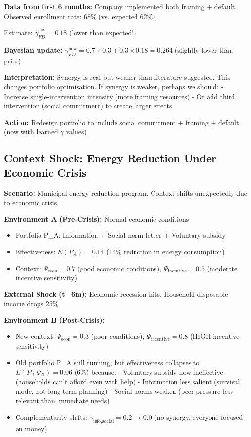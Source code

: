 \textbf{Data from first 6 months:} Company implemented both framing + default. Observed enrollment rate: 68\% (vs. expected 62\%).

Estimate: $\hat{\gamma}_{FD}^{\text{obs}} = 0.18$ (lower than expected!)

\textbf{Bayesian update:} $\gamma_{FD}^{\text{new}} = 0.7 \times 0.3 + 0.3 \times 0.18 = 0.264$ (slightly lower than prior)

\textbf{Interpretation:} Synergy is real but weaker than literature suggested. This changes portfolio optimization. If synergy is weaker, perhaps we should:
- Increase single-intervention intensity (more framing resources)
- Or add third intervention (social commitment) to create larger effects

\textbf{Action:} Redesign portfolio to include social commitment + framing + default (now with learned $\gamma$ values)

\subsection{Context Shock: Energy Reduction Under Economic Crisis}

\textbf{Scenario:} Municipal energy reduction program. Context shifts unexpectedly due to economic crisis.

\textbf{Environment A (Pre-Crisis):} Normal economic conditions
\begin{itemize}[nosep]
\item Portfolio P_A: Information + Social norm letter + Voluntary subsidy
\item Effectiveness: $E(P_A) = 0.14$ (14\% reduction in energy consumption)
\item Context: $\Psi_{\text{econ}} = 0.7$ (good economic conditions), $\Psi_{\text{incentive}} = 0.5$ (moderate incentive sensitivity)
\end{itemize}

\textbf{External Shock (t=6m):} Economic recession hits. Household disposable income drops 25\%.

\textbf{Environment B (Post-Crisis):}
\begin{itemize}[nosep]
\item New context: $\Psi_{\text{econ}} = 0.3$ (poor conditions), $\Psi_{\text{incentive}} = 0.8$ (HIGH incentive sensitivity)
\item Old portfolio P_A still running, but effectiveness collapses to $E(P_A | \Psi_B) = 0.06$ (6\%) because:
  - Voluntary subsidy now ineffective (households can't afford even with help)
  - Information less salient (survival mode, not long-term planning)
  - Social norms weaken (peer pressure less relevant than immediate needs)
\item Complementarity shifts: $\gamma_{\text{info,social}} = 0.2$ → $0.0$ (no synergy, everyone focused on money)
\end{itemize}


